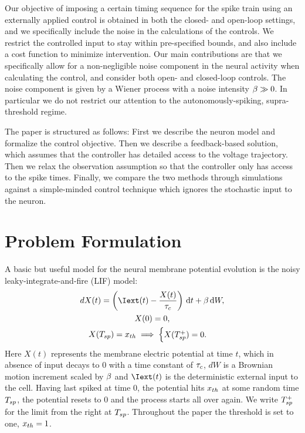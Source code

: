 Our objective of imposing a certain timing sequence for the spike train using an
externally applied control is obtained in both the closed- and
open-loop settings, and we specifically include the noise in the
calculations of the controls. We restrict the controlled input to stay
within pre-specified bounds, and also include a cost function to
minimize intervention.
Our main contributions are that we specifically allow for a
non-negligible noise component in the neural activity when calculating
the control, and consider both open- and closed-loop controls. The
noise component is given by a Wiener process with a noise intensity
$\beta \gg 0$. 
In particular we do not restrict our attention to the autonomously-spiking,
supra-threshold regime.

The paper is structured as follows: First we describe the neuron model and
formalize the control objective. Then we describe a feedback-based solution,
which assumes that the controller has detailed access to the voltage trajectory.
Then we relax the observation assumption so that the controller only has access
to the spike times. Finally, we compare the two methods through
simulations against a simple-minded control technique which ignores
the stochastic input to the neuron.

\section{Problem Formulation}
A basic but useful model for the neural membrane potential evolution is the
noisy leaky-integrate-and-fire (LIF) model:
\begin{equation}
\begin{gathered}
dX(t) = \left(\Iext(t) - \frac{X(t)}{\tc} \right) \intd{t} + \b \intd{W},
\\
X(0) = 0,
\\
X(\ts) = \xth \implies
\begin{cases}
X(\ts^+) = 0. & 
\end{cases}
\end{gathered}
\label{eq:X_evolution_uo_control}
\end{equation}
Here $X(t)$ represents the membrane electric potential at time $t$, which in
absence of input decays to $0$ with a time constant of $\tau_c$, $dW$ is a Brownian
motion increment scaled by $\beta$ and $\Iext(t)$ is the deterministic external input to the cell. Having last
spiked at time $0$, the potential hits ${ x_{th} }$ at some random time $T_{sp}$, the
potential resets to $0$ and the process starts all over again. 
We write $T_{sp}^+$ for the limit from the right at $T_{sp}$.
Throughout the paper the threshold is set to one, ${ x_{th} } = 1$.

